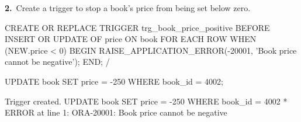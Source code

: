 \noindent\begin{minipage}{\linewidth}
\begingroup{}
{\fontsize{14}{17}\selectfont\textbf{2.}}\ Create a trigger to stop a book's price from being set below zero.\par
\endgroup\vspace{12pt}


\begin{sqlcode}
CREATE OR REPLACE TRIGGER trg_book_price_positive
BEFORE INSERT OR UPDATE OF price ON book
FOR EACH ROW
WHEN (NEW.price < 0)
BEGIN
   RAISE_APPLICATION_ERROR(-20001, 'Book price cannot be negative');
END;
/

UPDATE book SET price = -250 WHERE book_id = 4002;
\end{sqlcode}

\vspace{18pt}


\begin{sqlout}[fontsize=\small]
Trigger created.
UPDATE book SET price = -250 WHERE book_id = 4002
       *
ERROR at line 1:
ORA-20001: Book price cannot be negative
\end{sqlout}
\end{minipage}\par\vspace{24pt}

